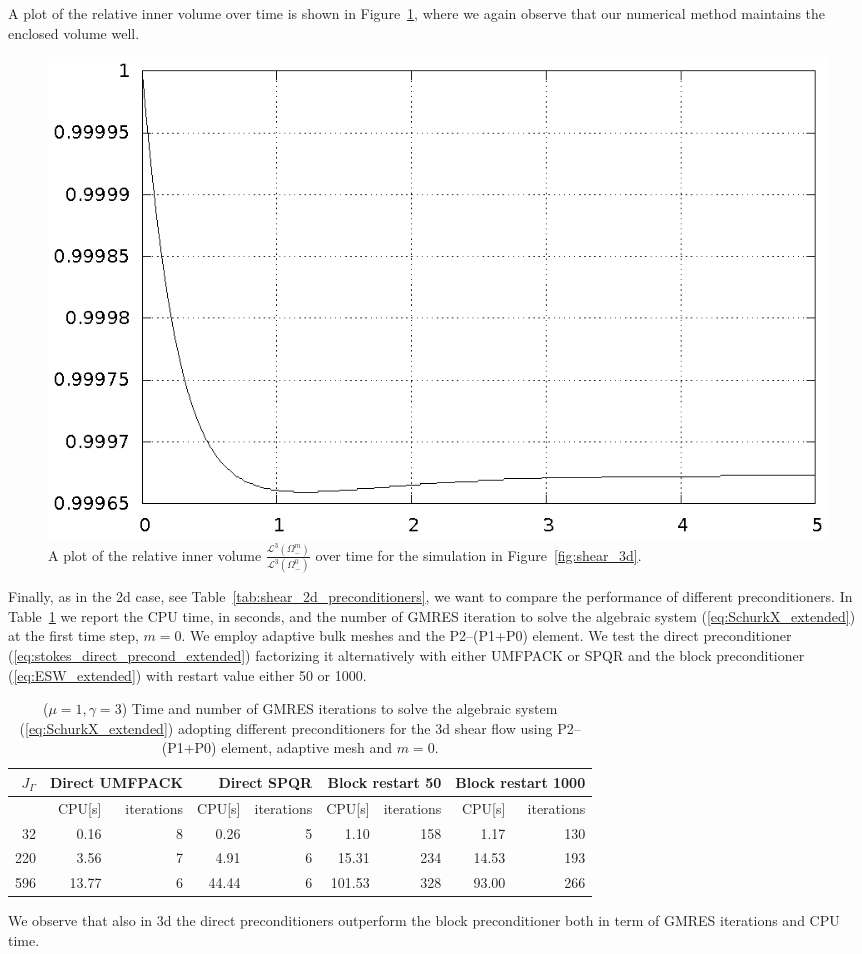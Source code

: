 A plot of the relative inner volume over time is shown in
Figure~\ref{fig:shear_3d_bulk_inner_volume}, where we again observe that our
numerical method maintains the enclosed volume well.
\begin{figure}[htbp]
\centering
\includegraphics[width=.45\textwidth]
{figures/stokes/3d_shear_bulk_inner_volume.ps}
\caption[Stokes 3d shear flow inner volume]
{A plot of the relative inner volume
$\frac{\mathcal{L}^3(\Omega^m_-)}{\mathcal{L}^3(\Omega^0_-)}$
over time for the simulation in Figure~\ref{fig:shear_3d}.}
\label{fig:shear_3d_bulk_inner_volume}
\end{figure}

Finally, as in the 2d case, see Table~\ref{tab:shear_2d_preconditioners}, we
want to compare the performance of different preconditioners. In
Table~\ref{tab:shear_3d_preconditioners} we report the CPU time, in seconds,
and the number of GMRES iteration to solve the algebraic system
(\ref{eq:SchurkX_extended}) at the first time step, $m=0$. We employ adaptive
bulk meshes and the P2--(P1+P0) element. We test the direct preconditioner
(\ref{eq:stokes_direct_precond_extended}) factorizing it alternatively with
either UMFPACK or SPQR and the block preconditioner (\ref{eq:ESW_extended})
with restart value either 50 or 1000.
\begin{table}
\center
\hspace*{-3.25cm}
\begin{tabular}{rrrrrrrrr}
\hline
$J_\Gamma$ & \multicolumn{2}{r}{Direct UMFPACK} &
\multicolumn{2}{r}{Direct SPQR} & \multicolumn{2}{r}{Block restart 50} &
\multicolumn{2}{r}{Block restart 1000} \\
\hline
 & CPU[s] & iterations & CPU[s] & iterations & CPU[s] & iterations & CPU[s] &
iterations \\
\hline
 32 &  0.16 & 8 &  0.26 & 5 &   1.10 & 158 &  1.17 & 130 \\
220 &  3.56 & 7 &  4.91 & 6 &  15.31 & 234 & 14.53 & 193 \\
596 & 13.77 & 6 & 44.44 & 6 & 101.53 & 328 & 93.00 & 266 \\
\hline
\end{tabular}
\hspace*{-3.25cm}
\caption[Stokes 3d shear flow preconditioners comparison]
{($\mu=1,\gamma=3$) Time and number of GMRES iterations to solve the algebraic
system (\ref{eq:SchurkX_extended}) adopting different preconditioners for the 3d
shear flow using P2--(P1+P0) element, adaptive mesh and $m=0$.}
\label{tab:shear_3d_preconditioners}
\end{table}
We observe that also in 3d the direct preconditioners outperform the block
preconditioner both in term of GMRES iterations and CPU time.
